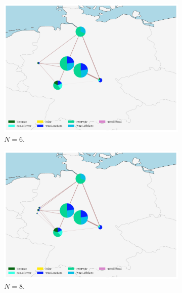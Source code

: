 \begin{figure}[H]
\centering
\begin{subfigure}[c]{0.5\linewidth}
\includegraphics[width=\linewidth]{Figures/eGo100_No4.pdf} 
\caption{$N=6$.}
\label{fig:3a}
\end{subfigure}\hfill    
\begin{subfigure}[c]{0.5\linewidth}
\includegraphics[width=\linewidth]{Figures/eGo100_No5.pdf}
\caption{$N=8$.}
\label{fig:3b}
\end{subfigure}
\begin{subfigure}[c]{0.5\linewidth}

\end{subfigure}
\end{figure}
